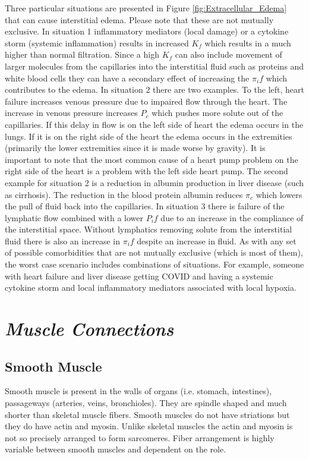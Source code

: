 Three particular situations are presented in Figure \ref{fig:Extracellular_Edema} that can cause interstitial edema. Please note that these are not mutually exclusive. 
In situation 1 inflammatory mediators (local damage) or a cytokine storm (systemic inflammation) results in increased $K_f$ which results in a much higher than normal filtration. Since a high $K_f$ can also include movement of larger molecules from the capillaries into the interstitial fluid such as proteins and white blood cells they can have a secondary effect of increasing the $\pi_if$ which contributes to the edema. 
In situation 2 there are two examples. To the left, heart failure increases venous pressure due to impaired flow through the heart. The increase in venous pressure increases $P_c$ which pushes more solute out of the capillaries. If this delay in flow is on the left side of heart the edema occurs in the lungs. If it is on the right side of the heart the edema occurs in the extremities (primarily the lower extremities since it is made worse by gravity). It is important to note that the most common cause of a heart pump problem on the right side of the heart is a problem with the left side heart pump. The second example for situation 2 is a reduction in albumin production in liver disease (such as cirrhosis). The reduction in the blood protein albumin reduces $\pi_c$ which lowers the pull of fluid back into the capillaries.
In situation 3 there is failure of the lymphatic flow combined with a lower $P_if$ due to an increase in the compliance of the interstitial space. Without lymphatics removing solute from the interstitial fluid there is also an increase in $\pi_if$ despite an increase in fluid.
As with any set of possible comorbidities that are not mutually exclusive (which is most of them), the worst case scenario includes combinations of situations. For example, someone with heart failure and liver disease getting COVID and having a systemic cytokine storm and local inflammatory mediators associated with local hypoxia. 

\section{\textit{Muscle Connections}}

\subsection{Smooth Muscle}

Smooth muscle is present in the walls of organs (i.e. stomach, intestines), passageways (arteries, veins, bronchioles). They are spindle shaped and much shorter than skeletal muscle fibers. Smooth muscles do not have striations but they do have actin and myosin. Unlike skeletal muscles the actin and myosin is not so precisely arranged to form sarcomeres. Fiber arrangement is highly variable between smooth muscles and dependent on the role. 

